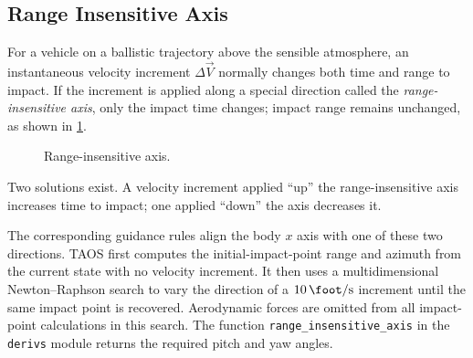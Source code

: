 \subsection{Range Insensitive Axis}\label{sec:range-insensitive-axis}

For a vehicle on a ballistic trajectory above the sensible atmosphere, an
instantaneous velocity increment $\Delta\vec V$ normally changes both time and
range to impact. If the increment is applied along a special direction called the
\emph{range-insensitive axis}, only the impact time changes; impact range remains
unchanged, as shown in \cref{fig:range-insensitive-axis}.

\begin{figure}[htbp]
  \centering
  
  \caption{Range-insensitive axis.}
  \label{fig:range-insensitive-axis}
\end{figure}

Two solutions exist. A velocity increment applied ``up'' the range-insensitive axis
increases time to impact; one applied ``down'' the axis decreases it.

The corresponding guidance rules align the body $x$ axis with one of these two
directions. TAOS first computes the initial-impact-point range and azimuth from the
current state with no velocity increment. It then uses a multidimensional
Newton--Raphson search to vary the direction of a
$\SI{10}{\foot\per\second}$ increment until the same impact point is recovered.
Aerodynamic forces are omitted from all impact-point calculations in this search.
The function \texttt{range\_insensitive\_axis} in the \texttt{derivs} module
returns the required pitch and yaw angles.

